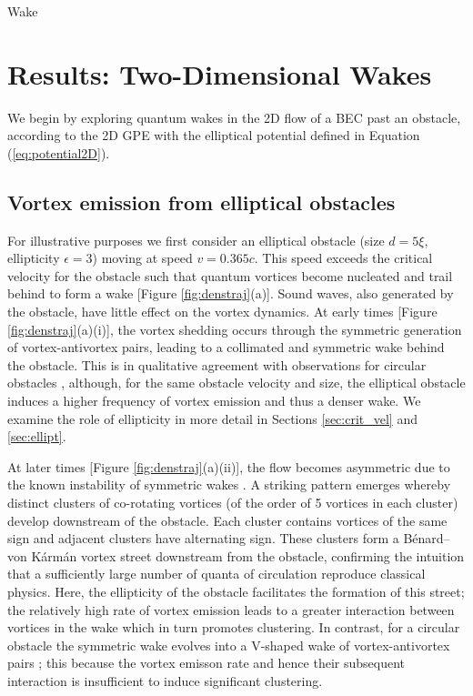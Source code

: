 \begin{chapter}{\label{cha:wake}Wake}
\section{Results: Two-Dimensional Wakes}
We begin by exploring quantum wakes in the 2D flow of a BEC past an obstacle, according to the 2D GPE with the elliptical potential defined in Equation  (\ref{eq:potential2D}).
\subsection{Vortex emission from elliptical obstacles}


For illustrative purposes we first consider an elliptical obstacle (size $d=5\xi$, ellipticity $\epsilon=3$) moving at speed $v=0.365c$.  This speed exceeds the critical velocity for the obstacle such that quantum vortices become nucleated and trail behind to form a wake [Figure \ref{fig:denstraj}(a)].  Sound waves, also generated by the obstacle, have little effect on the vortex dynamics. At early times [Figure \ref{fig:denstraj}(a)(i)], the vortex shedding occurs through the symmetric generation of vortex-antivortex pairs, leading to a collimated and symmetric wake behind the obstacle.  This is in qualitative agreement with observations for circular obstacles  \cite{frisch92,nore93,win00,huepe00}, although, for the same obstacle velocity and size, the elliptical obstacle induces a higher frequency of vortex emission and thus a denser wake.  We examine the role of ellipticity in more detail in Sections \ref{sec:crit_vel} and \ref{sec:ellipt}.  

At later times [Figure \ref{fig:denstraj}(a)(ii)], the flow becomes asymmetric due to the known instability of symmetric wakes \cite{nore93}.  A striking pattern emerges whereby distinct clusters of co-rotating vortices (of the order of 5 vortices in each cluster) develop downstream of the obstacle.  Each cluster contains vortices of the same sign and adjacent clusters have alternating sign.  These clusters form a B\'enard--von K\'arm\'an vortex street downstream from the obstacle, confirming the intuition that a sufficiently large number of quanta of circulation reproduce classical physics.  Here, the ellipticity of the obstacle facilitates the formation of this street; the relatively high rate of vortex emission leads to a greater interaction between vortices in the wake which in turn promotes clustering.  In contrast, for a circular obstacle the symmetric wake evolves into a V-shaped wake of vortex-antivortex pairs \cite{saito10}; this because the vortex emisson rate and hence their subsequent interaction is insufficient to induce significant clustering.  



\end{chapter}
